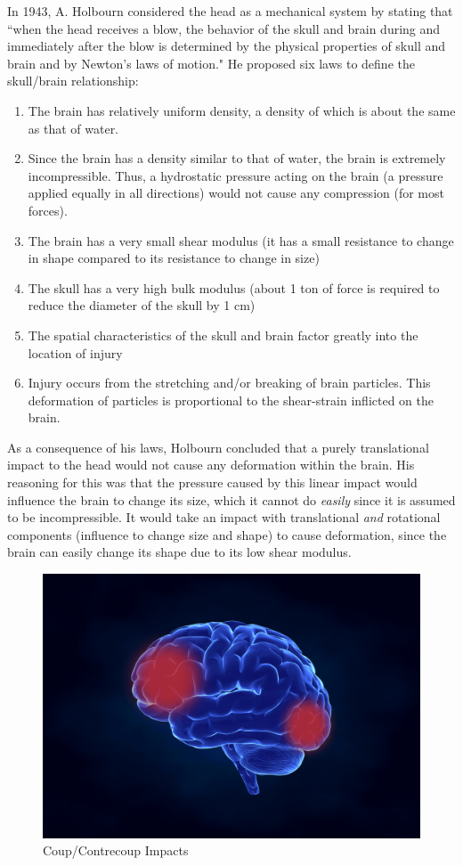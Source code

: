 \documentclass[%
 aip,
 amsmath,amssymb,
 reprint,%
 floatfix,%
]{revtex4-1}
\begin{document}
In 1943, A. Holbourn considered the head as a mechanical system by stating that ``when the head receives a blow, the behavior of the skull and brain during and immediately after the blow is determined by the physical properties of skull and brain and by Newton's laws of motion." \cite{Holbourn1943} He proposed six laws to define the skull/brain relationship:
\begin{enumerate}
	\item The brain has relatively uniform density, a density of which is about the same as that of water.
	\item Since the brain has a density similar to that of water, the brain is extremely incompressible. Thus, a hydrostatic pressure acting on the brain (a pressure applied equally in all directions) would not cause any compression (for most forces).
	\item The brain has a very small shear modulus (it has a small resistance to change in shape compared to its resistance to change in size)
	\item The skull has a very high bulk modulus (about 1 ton of force is required to reduce the diameter of the skull by 1 cm)
	\item The spatial characteristics of the skull and brain factor greatly into the location of injury
	\item Injury occurs from the stretching and/or breaking of brain particles. This deformation of particles is proportional to the shear-strain inflicted on the brain.
\end{enumerate}

As a consequence of his laws, Holbourn concluded that a purely translational impact to the head would not cause any deformation within the brain. His reasoning for this was that the pressure caused by this linear impact would influence the brain to change its size, which it cannot do {\it easily} since it is assumed to be incompressible. It would take an impact with translational {\it and} rotational components (influence to change size and shape) to cause deformation, since the brain can easily change its shape due to its low shear modulus.

\begin{figure}
	\centering
	\includegraphics[scale=0.09]{coup-contrecoup.png}
	\caption{Coup/Contrecoup Impacts}
\end{figure}
\end{document}
